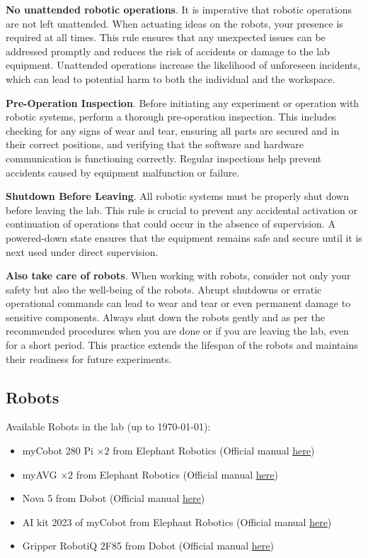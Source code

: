 \documentclass[hidelinks]{article}
\begin{document}
\textbf{No unattended robotic operations}. It is imperative that robotic operations are not left unattended. When actuating ideas on the robots, your presence is required at all times. This rule ensures that any unexpected issues can be addressed promptly and reduces the risk of accidents or damage to the lab equipment. Unattended operations increase the likelihood of unforeseen incidents, which can lead to potential harm to both the individual and the workspace.

\textbf{Pre-Operation Inspection}. Before initiating any experiment or operation with robotic systems, perform a thorough pre-operation inspection. This includes checking for any signs of wear and tear, ensuring all parts are secured and in their correct positions, and verifying that the software and hardware communication is functioning correctly. Regular inspections help prevent accidents caused by equipment malfunction or failure.

\textbf{Shutdown Before Leaving}. All robotic systems must be properly shut down before leaving the lab. This rule is crucial to prevent any accidental activation or continuation of operations that could occur in the absence of supervision. A powered-down state ensures that the equipment remains safe and secure until it is next used under direct supervision.

\textbf{Also take care of robots}. When working with robots, consider not only your safety but also the well-being of the robots. Abrupt shutdowns or erratic operational commands can lead to wear and tear or even permanent damage to sensitive components. Always shut down the robots gently and as per the recommended procedures when you are done or if you are leaving the lab, even for a short period. This practice extends the lifespan of the robots and maintains their readiness for future experiments.

\subsection*{Robots}
Available Robots in the lab (up to \today):
\begin{itemize}
    \item myCobot 280 Pi $\times 2$ from Elephant Robotics (Official manual \underline{\href{https://docs.elephantrobotics.com/docs/gitbook-en/2-serialproduct/2.1-280/2.1.2-PI.html}{here}})
    \item myAVG $\times 2$ from Elephant Robotics (Official manual \underline{\href{https://docs.elephantrobotics.com/docs/gitbook-en/2-serialproduct/2.5-myAGV.html}{here}})
    \item Nova 5 from Dobot (Official manual \underline{\href{https://www.dobot-robots.com/products/nova-series/nova5.html}{here}})
    \item AI kit 2023 of myCobot from Elephant Robotics (Official manual \underline{\href{https://docs.elephantrobotics.com/docs/gitbook-en/2-serialproduct/2.9-AIkit2023en/introduce.html}{here}})
    \item Gripper RobotiQ 2F85 from Dobot (Official manual \underline{\href{https://robotiq.com/products/2f85-140-adaptive-robot-gripper?ref=nav_product_new_button}{here}})
\end{itemize}
\end{document}
